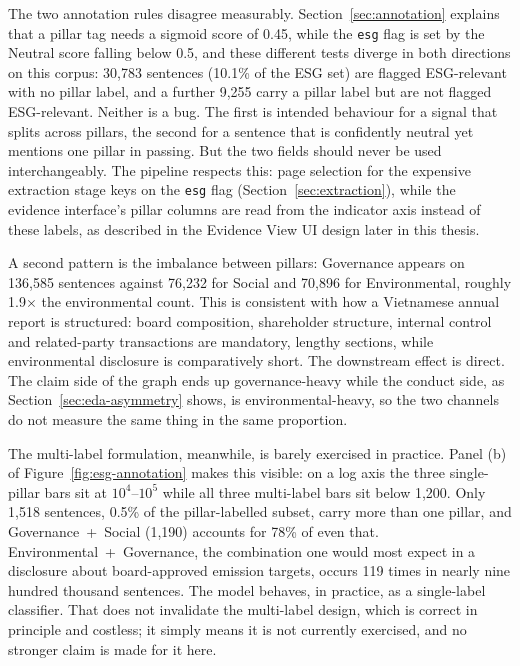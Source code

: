 \documentclass[fontsize=12pt,oneside,headings=small]{scrreprt}
\begin{document}
The two annotation rules disagree measurably.
Section~\ref{sec:annotation} explains that a pillar tag needs a sigmoid score of
0.45, while the \texttt{esg} flag is set by the Neutral score falling below
0.5, and these different tests diverge in both directions on this corpus:
30,783 sentences (10.1\% of the ESG set) are flagged ESG-relevant with no
pillar label, and a further 9,255 carry a pillar label but are not flagged
ESG-relevant. Neither is a bug. The first is intended behaviour for a
signal that splits across pillars, the second for a sentence that is
confidently neutral yet mentions one pillar in passing. But the two
fields should never be used interchangeably. The pipeline respects this: page
selection for the expensive extraction stage keys on the \texttt{esg} flag
(Section~\ref{sec:extraction}), while the evidence interface's pillar columns are
read from the indicator axis instead of these labels, as described in the
Evidence View UI design later in this thesis.

A second pattern is the imbalance between pillars: Governance appears on 136,585 sentences
against 76,232 for Social and 70,896 for Environmental, roughly
1.9$\times$ the environmental count. This is consistent with how a Vietnamese annual
report is structured: board composition, shareholder structure, internal
control and related-party transactions are mandatory, lengthy sections, while
environmental disclosure is comparatively short. The downstream effect is
direct. The claim side of the graph ends up governance-heavy while the conduct
side, as Section~\ref{sec:eda-asymmetry} shows, is environmental-heavy, so the two
channels do not measure the same thing in the same proportion.

The multi-label formulation, meanwhile, is barely exercised in practice. Panel (b) of
Figure~\ref{fig:esg-annotation} makes this visible: on a log axis the three
single-pillar bars sit at $10^{4}$--$10^{5}$ while all three multi-label
bars sit below 1,200. Only 1,518 sentences, 0.5\% of the pillar-labelled
subset, carry more than one pillar, and Governance~+~Social (1,190) accounts
for 78\% of even that. Environmental~+~Governance, the combination one would
most expect in a disclosure about board-approved emission targets, occurs
119 times in nearly nine hundred thousand sentences. The model behaves, in
practice, as a single-label classifier. That does not invalidate the
multi-label design, which is correct in principle and costless; it simply
means it is not currently exercised, and no stronger claim is made for it here.
\end{document}
